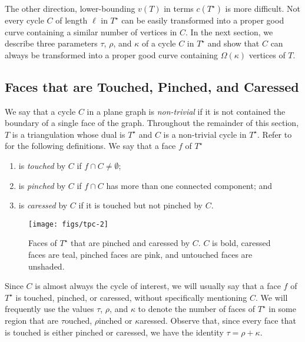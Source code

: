 \documentclass{patmorin}
\newcommand{\dual}[1]{{#1}^\star}
\begin{document}
The other direction, lower-bounding $v(T)$ in terms $c(\dual{T})$
is more difficult. Not every cycle $C$ of length $\ell$ in $\dual{T}$
can be easily transformed into a proper good curve containing a similar
number of vertices in $C$.  In the next section, we describe three
parameters $\tau$, $\rho$, and $\kappa$ of a cycle $C$ in $\dual{T}$
and show that $C$ can always be transformed into a proper good curve
containing $\Omega(\kappa)$ vertices of $T$.

\subsection{Faces that are Touched, Pinched, and Caressed}

We say that a cycle $C$ in a plane graph is \emph{non-trivial}
if it is not contained the boundary of a single face of the graph.
Throughout the remainder of this section, $T$ is a triangulation
whose dual is $\dual{T}$ and $C$ is a non-trivial cycle in $\dual{T}$.
Refer to  for the following definitions.
We say that a face $f$ of $\dual{T}$
\begin{enumerate}
  \item is \emph{touched} by $C$ if $f\cap C\neq \emptyset$;
  \item is \emph{pinched} by $C$ if $f\cap C$ has more than one connected
    component; and
  \item is \emph{caressed} by $C$ if it is touched but not pinched by $C$.
\end{enumerate}

\begin{figure}
  \begin{center}
    \texttt{[image: figs/tpc-2]}
  \end{center}
  \caption{Faces of $\dual{T}$ that are pinched and caressed by $C$. $C$
  is bold, caressed faces are teal, pinched faces are pink, and untouched
  faces are unshaded.} 
\end{figure}


Since $C$ is almost always the cycle of interest, we will usually say
that a face $f$ of $\dual{T}$ is touched, pinched, or caressed, without
specifically mentioning $C$.  We will frequently use the values $\tau$,
$\rho$, and $\kappa$ to denote the number of faces of $\dual{T}$ in
some region that are $\tau$ouched, $\rho$inched or $\kappa$aressed.
Observe that, since every face that is touched is either pinched or
caressed, we have the identity $\tau = \rho + \kappa$.
\end{document}
